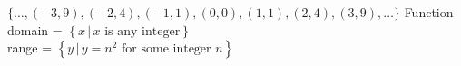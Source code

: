 {$ \{\ldots, (-3, 9), (-2, 4), (-1, 1), (0, 0), (1, 1), (2, 4), (3, 9),  \ldots\}$}
{Function \\ domain = $\left\{x \, | \, \text{$x$ is any integer}\right\}$ \\ range = $\left\{y \, | \, y = n^{2} \text{ for some integer } n\right\}$ }
